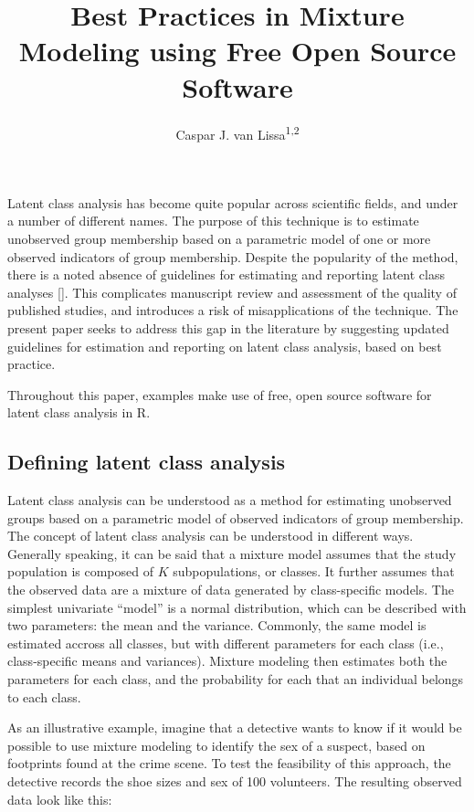 \documentclass[
  ,man]{apa6}
\title{Best Practices in Mixture Modeling using Free Open Source Software}
\author{Caspar J. van Lissa\textsuperscript{1,2}}
\date{}
\affiliation{\vspace{0.5cm}\textsuperscript{1} Utrecht University, Methodology \& Statistics\\\textsuperscript{2} Open Science Community Utrecht}
\begin{document}
\maketitle

Latent class analysis has become quite popular across scientific fields, and under a number of different names.
The purpose of this technique is to estimate unobserved group membership
based on a parametric model of one or more observed indicators of group membership.
Despite the popularity of the method, there is a noted absence of guidelines for estimating and reporting latent class analyses {[}{]}.
This complicates manuscript review and assessment of the quality of published studies,
and introduces a risk of misapplications of the technique.
The present paper seeks to address this gap in the literature by suggesting updated guidelines for estimation and reporting on latent class analysis, based on best practice.

Throughout this paper, examples make use of free, open source software for latent class analysis in R.

\hypertarget{defining-latent-class-analysis}{%
\subsection{Defining latent class analysis}\label{defining-latent-class-analysis}}

Latent class analysis can be understood as a method for estimating unobserved groups
based on a parametric model of observed indicators of group membership.
The concept of latent class analysis can be understood in different ways.
Generally speaking, it can be said that a mixture model assumes that the study population
is composed of \(K\) subpopulations, or classes.
It further assumes that the observed data are a mixture of data generated by class-specific models.
The simplest univariate ``model'' is a normal distribution, which can be described with two parameters:
the mean and the variance.
Commonly, the same model is estimated accross all classes, but with different parameters for each class (i.e., class-specific means and variances).
Mixture modeling then estimates both the parameters for each class, and the probability for each that an individual belongs to each class.

As an illustrative example, imagine that a detective wants to know if it would be
possible to use mixture modeling to identify the sex of a suspect,
based on footprints found at the crime scene.
To test the feasibility of this approach,
the detective records the shoe sizes and sex of 100 volunteers.
The resulting observed data look like this:
\end{document}
